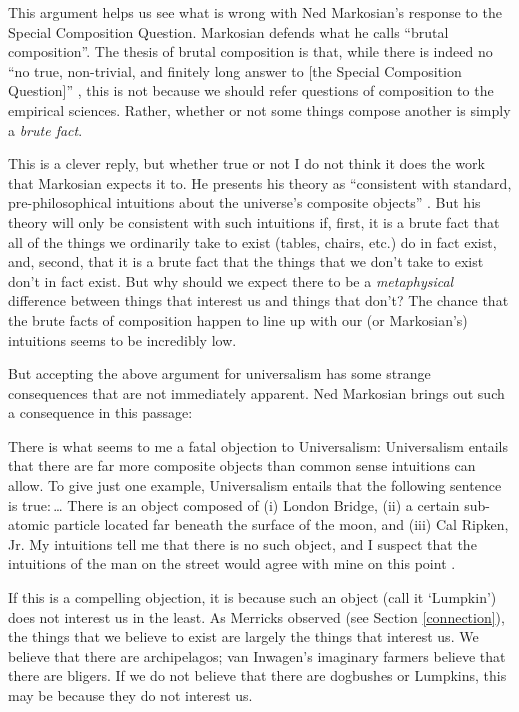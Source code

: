 \documentclass[12pt,twoside]{reedfancy}
\newenvironment{squote}{%
	\begin{spacing}{1}
	\begin{list}{}{%
	\setlength{\labelwidth}{0pt}%
	\rightmargin\leftmargin%
	}
	\item\relax
	}{%
	\end{list}%
	\end{spacing}
	}
\begin{document}
\begin{spacing}{1.25}
This argument helps us see what is wrong with Ned Markosian's response
to the Special Composition Question.  Markosian defends what he calls
``brutal composition''.  The thesis of brutal composition is that,
while there is indeed no ``no true, non-trivial, and finitely long
answer to [the Special Composition Question]''
\citeyearpar[214]{markosian1998a}, this is not because we should refer
questions of composition to the empirical sciences.  Rather, whether
or not some things compose another is simply a {\em brute fact}.

This is a clever reply, but whether true or not I do not think it does
the work that Markosian expects it to.  He presents his theory as
``consistent with standard, pre-philosophical intuitions about the
universe's composite objects'' \citeyearpar[211]{markosian1998a}.  But
his theory will only be consistent with such intuitions if, first, it
is a brute fact that all of the things we ordinarily take to exist
(tables, chairs, etc.) do in fact exist, and, second, that it is a
brute fact that the things that we don't take to exist don't in fact
exist.  But why should we expect there to be a {\em metaphysical}
difference between things that interest us and things that don't?  The
chance that the brute facts of composition happen to line up with our
(or Markosian's) intuitions seems to be incredibly low.

But accepting the above argument for universalism has some strange
consequences that are not immediately apparent.  Ned Markosian brings
out such a consequence in this passage:

\begin{squote}
There is what seems to me a fatal objection to Universalism:
Universalism entails that there are far more composite objects than
common sense intuitions can allow.  To give just one example,
Universalism entails that the following sentence is true:\,\ldots
There is an object composed of (i) London Bridge, (ii) a certain
sub-atomic particle located far beneath the surface of the moon, and
(iii) Cal Ripken, Jr.  My intuitions tell me that there is no such
object, and I suspect that the intuitions of the man on the street
would agree with mine on this point \citeyearpar[228]{markosian1998a}.
\end{squote}

If this is a compelling objection, it is because such an object (call
it `Lumpkin') does not interest us in the least.  As Merricks observed
(see Section \ref{connection}), the things that we believe to exist
are largely the things that interest us.  We believe that there are
archipelagos; van Inwagen's imaginary farmers believe that there are
bligers.  If we do not believe that there are dogbushes or Lumpkins,
this may be because they do not interest us.


\end{spacing}
\end{document}
